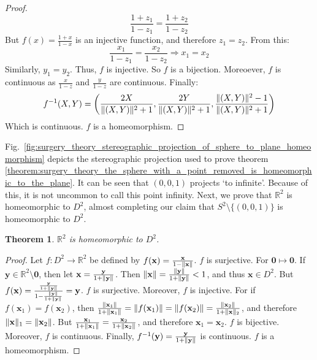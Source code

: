 \documentclass[oneside]{book}
\theoremstyle{mystyle}
\newtheorem{theorem}{Theorem}[section]
\DeclarePairedDelimiter\norm{\lVert}{\rVert}
\begin{document}
\begin{proof}
\begin{equation*}
    \frac{1+z_{1}}{1-z_{1}} = \frac{1+z_{2}}{1-z_{2}}   
\end{equation*}
%
But $f(x) = \frac{1+x}{1-x}$ is an injective function, and therefore $z_{1} = z_{2}$. From this:
%
\begin{equation*}
    \frac{x_{1}}{1-z_{1}} = \frac{x_{2}}{1-z_{2}} \Rightarrow x_{1} = x_{2}
\end{equation*}
%
Similarly, $y_{1} = y_{2}$. Thus, $f$ is injective. So $f$ is a bijection. Moreoever, $f$ is continuous as $\frac{x}{1-z}$ and $\frac{y}{1-z}$ are continuous. Finally:
\begin{equation*}
    f^{-1}(X,Y) = \bigg(\frac{2X}{\norm{(X,Y)}^{2}+1},\frac{2Y}{\norm{(X,Y)}^{2}+1},\frac{\norm{(X,Y)}^{2}-1}{\norm{(X,Y)}^{2}+1}\bigg)
\end{equation*}
Which is continuous. $f$ is a homeomorphism.
\end{proof}
Fig.~\ref{fig:surgery_theory_stereographic_projection_of_sphere_to_plane_homeomorphism} depicts the stereographic projection used to prove theorem \ref{theorem:surgery_theory_the_sphere_with_a_point_removed_is_homeomorphic_to_the_plane}. It can be seen that $(0,0,1)$ projects `to infinite'. Because of this, it is not uncommon to call this point infinity. Next, we prove that $\mathbb{R}^{2}$ is homeomorphic to $D^{2}$, almost completing our claim that $S^{2}\setminus \{(0,0,1)\}$ is homeomorphic to $D^{2}$.
\begin{theorem}
$\mathbb{R}^{2}$ is homeomorphic to $D^{2}$.
\end{theorem}
\begin{proof}
Let $f:D^{2}\rightarrow \mathbb{R}^{2}$ be defined by $f(\mathbf{x}) = \frac{\mathbf{x}}{1-\norm{\mathbf{x}}}$. $f$ is surjective. For $\mathbf{0}\mapsto \mathbf{0}$. If $\mathbf{y}\in \mathbb{R}^2\setminus \mathbf{0}$, then let $\mathbf{x} = \frac{\mathbf{y}}{1+\norm{\mathbf{y}}}$. Then $\norm{\mathbf{x}} = \frac{\norm{\mathbf{y}}}{1+\norm{\mathbf{y}}} < 1$, and thus $\mathbf{x}\in D^{2}$. But $f(\mathbf{x}) = \frac{\frac{\mathbf{y}}{1+\norm{\mathbf{y}}}}{1 - \frac{\norm{\mathbf{y}}}{1+\norm{\mathbf{y}}}} = \mathbf{y}$. $f$ is surjective. Moreover, $f$ is injective. For if $f(\mathbf{x}_{1}) = f(\mathbf{x}_{2})$, then $\frac{\norm{\mathbf{x}_{1}}}{1+\norm{\mathbf{x}_{1}}} = \norm{f(\mathbf{x}_{1})} = \norm{f(\mathbf{x}_{2})} = \frac{\norm{\mathbf{x}_{2}}}{1+\norm{\mathbf{x}}_{2}}$, and therefore $\norm{\mathbf{x}}_{1} = \norm{\mathbf{x}_{2}}$. But $\frac{\mathbf{x}_{1}}{1+\norm{\mathbf{x}_{1}}} = \frac{\mathbf{x}_{2}}{1+\norm{\mathbf{x}_{2}}}$, and therefore $\mathbf{x}_{1} = \mathbf{x}_{2}$. $f$ is bijective. Moreover, $f$ is continuous. Finally, $f^{-1}(\mathbf{y}) = \frac{\mathbf{y}}{1+\norm{\mathbf{y}}}$ is continuous. $f$ is a homeomorphism.
\end{proof}
\end{document}
